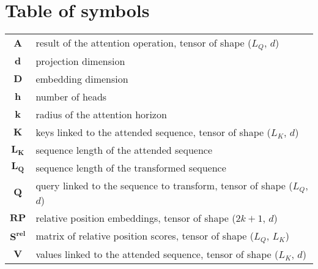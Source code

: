 \section*{Table of symbols}

\begin{table}[H]
\begin{tabular}{cl}
	$\boldsymbol{A}$ & result of the attention operation, tensor of shape ($L_Q$, $d$)\\
	$\boldsymbol{d}$ & projection dimension\\
	$\boldsymbol{D}$ & embedding dimension\\
	$\boldsymbol{h}$ & number of heads\\
	$\boldsymbol{k}$ & radius of the attention horizon\\
	$\boldsymbol{K}$ & keys linked to the attended sequence, tensor of shape ($L_K$, $d$)\\
	$\boldsymbol{L_K}$ & sequence length of the attended sequence\\
	$\boldsymbol{L_Q}$ & sequence length of the transformed sequence\\
	$\boldsymbol{Q}$ & query linked to the sequence to transform, tensor of shape ($L_Q$, $d$)\\
	$\boldsymbol{RP}$ & relative position embeddings, tensor of shape ($2k+1$, $d$)\\
	$\boldsymbol{S^{rel}}$ & matrix of relative position scores, tensor of shape ($L_Q$, $L_K$)\\
	$\boldsymbol{V}$ & values linked to the attended sequence, tensor of shape ($L_K$, $d$)\\
\end{tabular}
\end{table}

\endinput